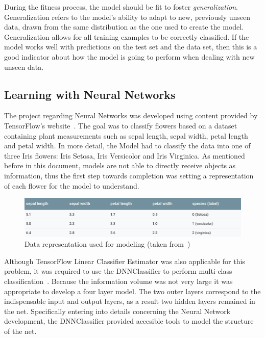 During the fitness process, the model should be fit to foster \emph{generalization}. 
Generalization refers to the model’s ability to adapt to new, previously unseen data, drawn from the 
same distribution as the one used to create the model.  Generalization allows for all training examples 
to be correctly classified. If the model works well with predictions on the test set and the data set, then 
this is a good indicator about how the model is going to perform when dealing with new unseen data.  


\subsection{Learning with Neural Networks}

The project regarding Neural Networks was developed using content provided by TensorFlow's website~\cite{tensor18}. The goal was to classify flowers based on a dataset containing plant measurements such as sepal length, sepal width, petal length and petal width. In more detail, the Model had to classify the data into one of three Iris flowers: Iris Setosa, Iris Versicolor and Iris Virginica. 
As mentioned before in this document, models are not able to directly receive objects as information, thus the first step towards completion was setting a representation of each flower for the model to understand. 

\begin{figure}[htbp]
  \centering
  \includegraphics[width=\textwidth]{images/table}
  \caption{Data representation used for modeling (taken from~\cite{tensor18})}
  \label{fig: rep}
\end{figure}

Although TensorFlow Linear Classifier Estimator was also applicable for this problem, it was required to use the DNNClassifier to perform multi-class classification~\cite{tensor18}. Because the information volume was not very large it was appropriate to develop a four layer model. The two outer layers correspond to the indispensable input and output layers, as a result  two hidden layers remained in the net. Specifically entering into details concerning the Neural Network development, the DNNClassifier  provided accesible tools to model the structure of the net.

